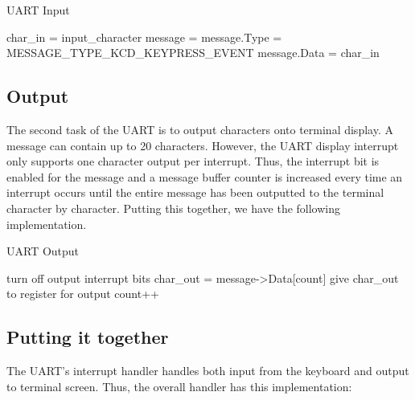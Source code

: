 \documentclass[12pt]{report}
\begin{document}
\begin{algorithm}
    \caption{UART Input}
    \begin{algorithmic}[1]
          \State char\_in = input\_character
          \EndIf
          \State message = 
          \State message.Type = MESSAGE\_TYPE\_KCD\_KEYPRESS\_EVENT
          \State message.Data = char\_in
          \State {}
      \EndIf
  \end{algorithmic}
\end{algorithm}

\subsection{Output}
\label{sec:uart_output}
The second task of the UART is to output characters onto terminal display. A message can contain up to 20 characters. However, the UART display interrupt only supports one character output per interrupt. Thus, the interrupt bit is enabled for the message and a message buffer counter is increased every time an interrupt occurs until the entire message has been outputted to the terminal character by character. Putting this together, we have the following implementation.

\begin{algorithm}
    \caption{UART Output}
    \begin{algorithmic}[1]
              \State {}
              \State turn off output interrupt bits
          \Else
              \State char\_out = message->Data[count]
              \State give char\_out to register for output
              \State count++
          \EndIf
      \EndIf
  \end{algorithmic}
\end{algorithm}


\subsection{Putting it together}
The UART's interrupt handler handles both input from the keyboard and output to terminal screen. Thus, the overall handler has this implementation:
\end{document}
